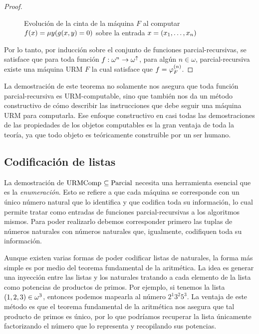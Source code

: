 \begin{proof}
\begin{itemize}
\begin{itemize}
\begin{figure}[h!]
		\caption[Máquina URM de la minimización no acotada]{Evolución de la cinta de la máquina $F$ al computar $f\pa*{x} =\mu y\pa*{g\pa*{x, y} = 0}$ sobre la entrada $x =\pa*{x_{1},\dotsc, x_{n}}$}
		\label{fig:cinta_minimizacion}
	\end{figure}

		\end{itemize}
	\end{itemize}

	Por lo tanto, por inducción sobre el conjunto de funciones parcial-recursivas, se satisface que para toda función $f:\omega^{n}\to\omega^{\DIVERGE}$, para algún $n\in\omega$, parcial-recursiva existe una máquina URM $F$ la cual satisface que $f =\PHI{F}[n]$.
\end{proof}

La demostración de este teorema no solamente nos asegura que toda función parcial-recursiva es URM-computable, sino que también nos da un método constructivo de cómo describir las instrucciones que debe seguir una máquina URM para computarla. Ese enfoque constructivo en casi todas las demostraciones de las propiedades de los objetos computables es la gran ventaja de toda la teoría, ya que todo objeto es teóricamente construible por un ser humano.

\subsection{Codificación de listas}

La demostración de $\URMCOMPUTABLE\subseteq\PARCIAL$ necesita una herramienta esencial que es la \emph{enumeración}. Esto se refiere a que cada máquina se corresponde con un único número natural que lo identifica y que codifica toda su información, lo cual permite tratar como entradas de funciones parcial-recursivas a los algoritmos mismos. Para poder realizarlo debemos corresponder primero las tuplas de números naturales con números naturales que, igualmente, codifiquen toda su información.

Aunque existen varias formas de poder codificar listas de naturales, la forma más simple es por medio del teorema fundamental de la aritmética. La idea es generar una inyección entre las listas y los naturales tratando a cada elemento de la lista como potencias de productos de primos. Por ejemplo, si tenemos la lista $\pa*{1, 2, 3}\in\omega^{3}$, entonces podemos mapearla al número $2^{1}3^{2}5^{3}$. La ventaja de este método es que el teorema fundamental de la aritmética nos asegura que tal producto de primos es único, por lo que podríamos recuperar la lista únicamente factorizando el número que lo representa y recopilando sus potencias.

